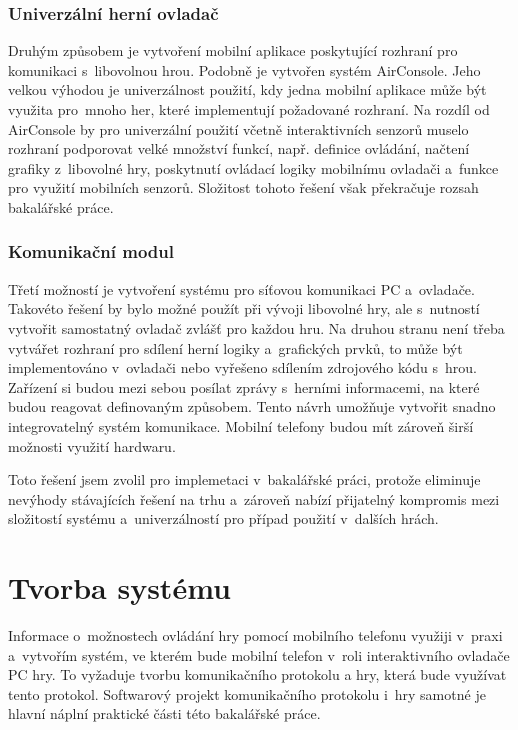 \documentclass[thesis=B,czech,hidelinks]{FITthesis}[2012/06/26] %
\begin{document}
\subsection{Univerzální herní ovladač}

Druhým způsobem je vytvoření mobilní aplikace poskytující rozhraní pro komunikaci s~libovolnou hrou. Podobně je vytvořen systém AirConsole. Jeho velkou výhodou je univerzálnost použití, kdy jedna mobilní aplikace může být využita pro~mnoho her, které implementují požadované rozhraní. Na rozdíl od AirConsole by pro univerzální použití včetně interaktivních senzorů muselo rozhraní podporovat velké množství funkcí, např. definice ovládání, načtení grafiky z~libovolné hry, poskytnutí ovládací logiky mobilnímu ovladači a~funkce pro využití mobilních senzorů. Složitost tohoto řešení však překračuje rozsah bakalářské práce.

\subsection{Komunikační modul}

Třetí možností je vytvoření systému pro síťovou komunikaci PC a~ovladače. Takovéto řešení by bylo možné použít při vývoji libovolné hry, ale s~nutností vytvořit samostatný ovladač zvlášť pro každou hru. Na druhou stranu není třeba vytvářet rozhraní pro sdílení herní logiky a~grafických prvků, to může být implementováno v~ovladači nebo vyřešeno sdílením zdrojového kódu s~hrou. Zařízení si budou mezi sebou posílat zprávy s~herními informacemi, na které budou reagovat definovaným způsobem. Tento návrh umožňuje vytvořit snadno integrovatelný systém komunikace. Mobilní telefony budou mít zároveň širší možnosti využití hardwaru.

Toto řešení jsem zvolil pro implemetaci v~bakalářské práci, protože eliminuje nevýhody stávajících řešení na trhu a~zároveň nabízí přijatelný kompromis mezi složitostí systému a~univerzálností pro případ použití v~dalších hrách. 

\chapter{Tvorba systému}
\label{chapter:implementation}

Informace o~možnostech ovládání hry pomocí mobilního telefonu využiji v~praxi a~vytvořím systém, ve kterém bude mobilní telefon v~roli interaktivního ovladače PC hry. To vyžaduje tvorbu komunikačního protokolu a hry, která bude využívat tento protokol. Softwarový projekt komunikačního protokolu i~hry samotné je hlavní náplní praktické části této bakalářské práce.
\end{document}
